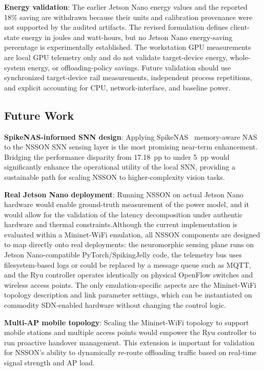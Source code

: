 \documentclass[journal]{IEEEtran}
\newcommand{\revblue}[1]{\textcolor{revblue}{#1}}
\begin{document}
\textbf{Energy validation}: The earlier Jetson Nano energy values and the reported 18\% saving are withdrawn because their units and calibration provenance were not supported by the audited artifacts. The revised formulation defines client-state energy in joules and watt-hours, but no Jetson Nano energy-saving percentage is experimentally established. The workstation GPU measurements are local GPU telemetry only and do not validate target-device energy, whole-system energy, or offloading-policy savings. Future validation should use synchronized target-device rail measurements, independent process repetitions, and explicit accounting for CPU, network-interface, and baseline power.

\subsection{Future Work}

\textbf{SpikeNAS-informed SNN design}: Applying SpikeNAS~\cite{putra2025spikenas} memory-aware NAS to the NSSON SNN sensing layer is the most promising near-term enhancement. Bridging the performance disparity from 17.18~pp to under 5~pp would significantly enhance the operational utility of the local SNN, providing a sustainable path for scaling NSSON to higher-complexity vision tasks.

\textbf{Real Jetson Nano deployment}: Running NSSON on actual Jetson Nano hardware would enable ground-truth measurement of the power model, and it would allow for the validation of the latency decomposition under authentic hardware and thermal constraints.\revblue{Although the current implementation is evaluated within a
Mininet-WiFi emulation, all NSSON components are designed to map
directly onto real deployments: the neuromorphic sensing plane runs on
Jetson Nano-compatible PyTorch/SpikingJelly code, the telemetry bus uses
filesystem-based logs or could be replaced by a message queue such as
MQTT, and the Ryu controller operates identically on physical OpenFlow
switches and wireless access points. The only emulation-specific aspects
are the Mininet-WiFi topology description and link parameter settings,
which can be instantiated on commodity SDN-enabled hardware without
changing the control logic.}

\textbf{Multi-AP mobile topology}: Scaling the Mininet-WiFi topology to support mobile stations and multiple access points would empower the Ryu controller to run proactive handover management. This extension is important for validation for NSSON's ability to dynamically re-route offloading traffic based on real-time signal strength and AP load.
\end{document}
